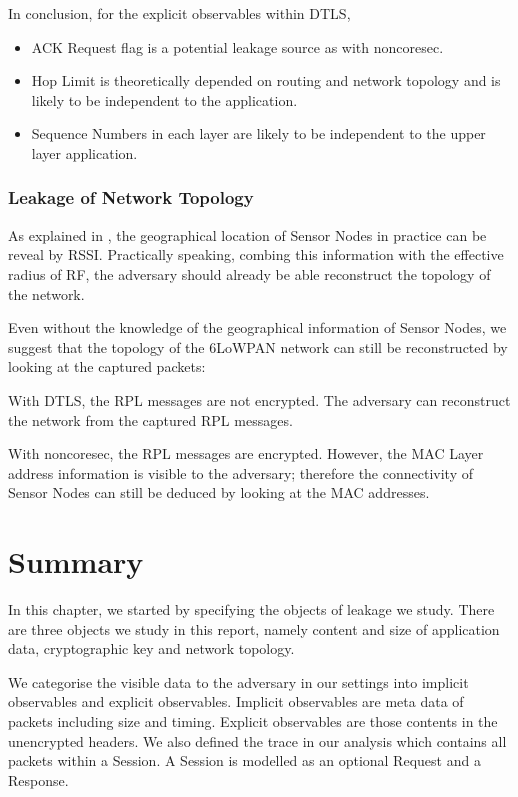 In conclusion, for the explicit observables within DTLS,

\begin{itemize}
	\item ACK Request flag is a potential leakage source as with noncoresec.
	\item Hop Limit is theoretically depended on routing and network topology and is likely to be independent to the application.
	\item Sequence Numbers in each layer are likely to be independent to the upper layer application.
\end{itemize}

\subsubsection{Leakage of Network Topology}

As explained in , the geographical location of Sensor Nodes in practice can be reveal by RSSI. Practically speaking, combing this information with the effective radius of RF, the adversary should already be able reconstruct the topology of the network.

Even without the knowledge of the geographical information of Sensor Nodes, we suggest that the topology of the 6LoWPAN network can still be reconstructed by looking at the captured packets:

\begin{description}[style=nextline]
	\item With DTLS, the RPL messages are not encrypted. The adversary can reconstruct the network from the captured RPL messages.
	\item With noncoresec, the RPL messages are encrypted. However, the MAC Layer address information is visible to the adversary; therefore the connectivity of Sensor Nodes can still be deduced by looking at the MAC addresses.
\end{description}

\section{Summary}

In this chapter, we started by specifying the objects of leakage we study. There are three objects we study in this report, namely content and size of application data, cryptographic key and network topology.

We categorise the visible data to the adversary in our settings into implicit observables and explicit observables. Implicit observables are meta data of packets including size and timing. Explicit observables are those contents in the unencrypted headers. We also defined the trace in our analysis which contains all packets within a Session. A Session is modelled as an optional Request and a Response.

